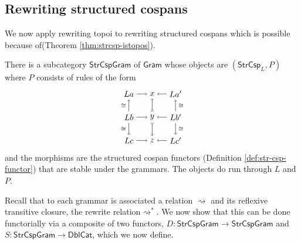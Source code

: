 \documentclass{amsart}
\newcommand{\iso}{\cong}
\newcommand{\DblCat}{\cat{DblCat}}
\newcommand{\Gram}{\cat{Gram}}
\newcommand{\StrCsp}{\cat{StrCsp}}
\newcommand{\StrCspGram}{\cat{StrCspGram}}
\newcommand{\cat}[1]{\mathsf{#1}}
\newcommand{\from}{\colon}
\theoremstyle{remark}
\theoremstyle{definition}
\begin{document}

\subsection{Rewriting structured cospans}
\label{sec:Rewriting-StrCsp}

We now apply rewriting topoi to rewriting structured cospans which is
possible because of(Theorem \ref{thm:strcsp-istopos}).

There is a subcategory $ \StrCspGram $ of $ \Gram $ whose objects are
$ ( \StrCsp_{L} , P ) $ where $ P $ consists of rules of the form
 \[
   \begin{tikzpicture}
    \begin{scope}
        \node (1) at (0,2) {\( La \)};
        \node (2) at (1,2) {\( x \)};
        \node (3) at (2,2) {\( La' \)};
        \node (4) at (0,1) {\( Lb \)};
        \node (5) at (1,1) {\( y \)};
        \node (6) at (2,1) {\( Lb' \)};
        \node (7) at (0,0) {\( Lc \)};
        \node (8) at (1,0) {\( z \)};
        \node (9) at (2,0) {\( Lc' \)};
        \draw [->] (1) to node []
          {\scriptsize{\( \)}} (2);
        \draw [->] (3) to node []
          {\scriptsize{\( \)}} (2);
        \draw [->] (4) to node []
          {\scriptsize{\( \)}} (5);
        \draw [->] (6) to node []
          {\scriptsize{\( \)}} (5);
        \draw [->] (7) to node []
          {\scriptsize{\( \)}} (8);
        \draw [->] (9) to node []
          {\scriptsize{\( \)}} (8);
        \draw [->] (4) to node [left]
          {\scriptsize{\( \iso \)}} (1);
        \draw [->] (4) to node [left]
          {\scriptsize{\( \iso \)}} (7);
        \draw [>->] (5) to node []
          {\scriptsize{\( \)}} (2);
        \draw [>->] (5) to node []
          {\scriptsize{\( \)}} (8);
        \draw [->] (6) to node [right]
          {\scriptsize{\( \iso \)}} (3);
        \draw [->] (6) to node [right]
          {\scriptsize{\( \iso \)}} (9);
    \end{scope}
  \end{tikzpicture}
\]
%
and the morphisms are the structured cospan functors (Definition
\ref{def:str-csp-functor}) that are stable under the grammars. The
objects do run through $ L $ and $ P $.  

Recall that to each grammar is associated a relation
$ \rightsquigarrow $ and its reflexive transitive closure, the rewrite
relation$ \rightsquigarrow^\ast $. We now show that this can be done
functorially via a composite of two functors,
$ D \from \StrCspGram \to \StrCspGram $ and
$ S \from \StrCspGram \to \DblCat $, which we now define.
\end{document}

